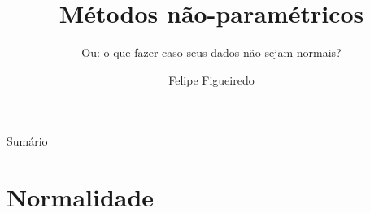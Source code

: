 \documentclass{beamer}
\title%
{Métodos não-paramétricos}
\subtitle
{Ou: o que fazer caso seus dados não sejam normais?} %
\author%
{Felipe Figueiredo}%
\institute[INTO] %
{Instituto Nacional de Traumatologia e Ortopedia
}
\date%
{}
\begin{document}
\begin{frame}
  \titlepage
\end{frame}

\begin{frame}{Sumário}
  \tableofcontents
\end{frame}








\section{Normalidade}
\end{document}
